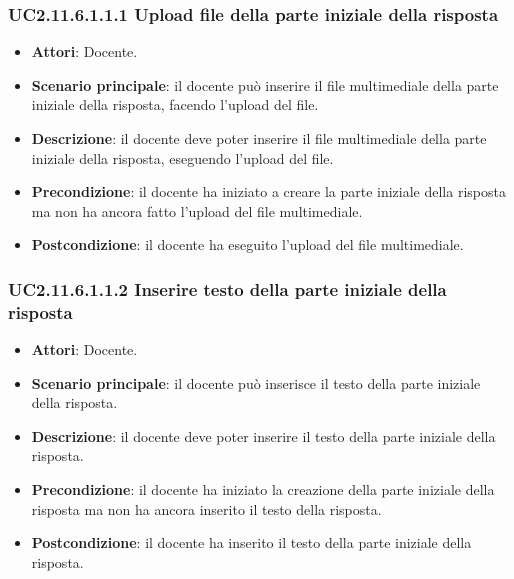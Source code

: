 \subsubsection{UC2.11.6.1.1.1 Upload file della parte iniziale della risposta}
\begin{itemize}
\item \textbf{Attori}: Docente.
\item \textbf{Scenario principale}: il docente può inserire il file multimediale della parte iniziale della risposta, facendo l'upload del file.
\item \textbf{Descrizione}: il docente deve poter inserire il file multimediale della parte iniziale della risposta, eseguendo l'upload del file.
\item \textbf{Precondizione}: il docente ha iniziato a creare la parte iniziale della risposta ma non ha ancora fatto l'upload del file multimediale.
\item \textbf{Postcondizione}: il docente ha eseguito l'upload del file multimediale.
\end{itemize}
\subsubsection{UC2.11.6.1.1.2 Inserire testo della parte iniziale della risposta}
\begin{itemize}
\item \textbf{Attori}: Docente.
\item \textbf{Scenario principale}: il docente può inserisce il testo della parte iniziale della risposta.
\item \textbf{Descrizione}: il docente deve poter inserire il testo della parte iniziale della risposta.
\item \textbf{Precondizione}: il docente ha iniziato la creazione della parte iniziale della risposta ma non ha ancora inserito il testo della risposta.
\item \textbf{Postcondizione}: il docente ha inserito il testo della parte iniziale della risposta.
\end{itemize}
